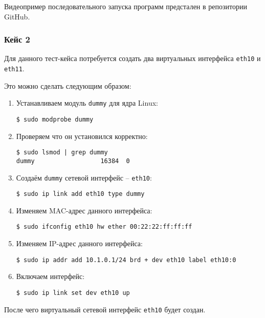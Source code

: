 \linespace

Видеопример последовательного запуска программ предстален в репозитории GitHub.

\subsubsection{Кейс 2}

Для данного тест-кейса потребуется создать два виртуальных интерфейса \verb|eth10| и \verb|eth11|.

Это можно сделать следующим образом:
\begin{enumerate}

\item Устанавливаем модуль \verb|dummy| для ядра Linux:
\begin{lstlisting}
$ sudo modprobe dummy
\end{lstlisting}

\item Проверяем что он установился корректно:
\begin{lstlisting}
$ sudo lsmod | grep dummy
dummy                  16384  0 
\end{lstlisting}

\item Создаём \verb|dummy| сетевой интерфейс -- \verb|eth10|:
\begin{lstlisting}
$ sudo ip link add eth10 type dummy
\end{lstlisting}

\item Изменяем MAC-адрес данного интерфейса:
\begin{lstlisting}
$ sudo ifconfig eth10 hw ether 00:22:22:ff:ff:ff
\end{lstlisting}

\newpage

\item Изменяем IP-адрес данного интерфейса:
\begin{lstlisting}
$ sudo ip addr add 10.1.0.1/24 brd + dev eth10 label eth10:0
\end{lstlisting}

\item Включаем интерфейс:
\begin{lstlisting}
$ sudo ip link set dev eth10 up
\end{lstlisting}
\end{enumerate}

\linespace

После чего виртуальный сетевой интерфейс \verb|eth10| будет создан.

